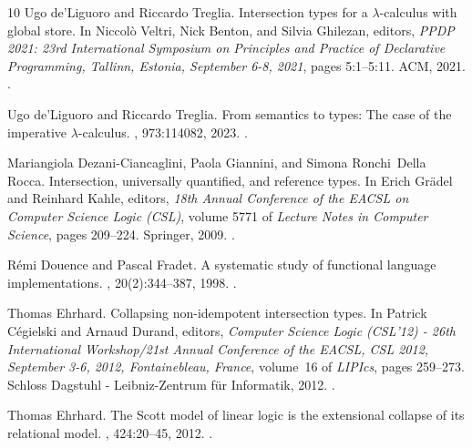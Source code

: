 \documentclass[10pt,a4paper]{amsart}
\begin{document}
\begin{thebibliography}{10}
Ugo de'Liguoro and Riccardo Treglia.
\newblock Intersection types for a {\(\lambda\)}-calculus with global store.
\newblock In Niccol{\`{o}} Veltri, Nick Benton, and Silvia Ghilezan, editors,
  {\em {PPDP} 2021: 23rd International Symposium on Principles and Practice of
  Declarative Programming, Tallinn, Estonia, September 6-8, 2021}, pages
  5:1--5:11. {ACM}, 2021.
\newblock \href {https://doi.org/10.1145/3479394.3479400}
  {}.

Ugo de'Liguoro and Riccardo Treglia.
\newblock From semantics to types: {T}he case of the imperative
  \emph{{\(\lambda\)}}-calculus.
, 973:114082, 2023.
\newblock \href {https://doi.org/10.1016/J.TCS.2023.114082}
  {}.

Mariangiola Dezani{-}Ciancaglini, Paola Giannini, and Simona Ronchi~Della
  Rocca.
\newblock Intersection, universally quantified, and reference types.
\newblock In Erich Gr{\"{a}}del and Reinhard Kahle, editors, {\em 18th Annual
  Conference of the EACSL on Computer Science Logic (CSL)}, volume 5771 of {\em
  Lecture Notes in Computer Science}, pages 209--224. Springer, 2009.
\newblock \href {https://doi.org/10.1007/978-3-642-04027-6\_17}
  {}.

R{\'e}mi Douence and Pascal Fradet.
\newblock A systematic study of functional language implementations.
,
  20(2):344--387, 1998.
\newblock \href {https://doi.org/10.1145/276393.276397}
  {}.

Thomas Ehrhard.
\newblock Collapsing non-idempotent intersection types.
\newblock In Patrick C{\'{e}}gielski and Arnaud Durand, editors, {\em Computer
  Science Logic (CSL'12) - 26th International Workshop/21st Annual Conference
  of the EACSL, {CSL} 2012, September 3-6, 2012, Fontainebleau, France},
  volume~16 of {\em LIPIcs}, pages 259--273. Schloss Dagstuhl - Leibniz-Zentrum
  f{\"{u}}r Informatik, 2012.
\newblock \href {https://doi.org/10.4230/LIPICS.CSL.2012.259}
  {}.

Thomas Ehrhard.
\newblock The {S}cott model of linear logic is the extensional collapse of its
  relational model.
, 424:20--45, 2012.
\newblock \href {https://doi.org/10.1016/J.TCS.2011.11.027}
  {}.


\end{thebibliography}
\end{document}
